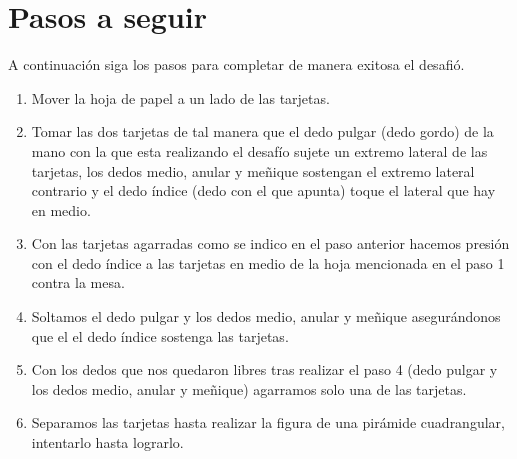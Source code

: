 \documentclass{article}
\begin{document}
\section{Pasos a seguir} \label{contenido}
A continuación siga los pasos para completar de manera exitosa el desafió. 

\begin{enumerate}
    \item Mover la hoja de papel a un lado de las tarjetas.
    \item Tomar las dos tarjetas de tal manera que el dedo pulgar (dedo gordo) de la mano con la que esta realizando el desafío sujete un extremo lateral de las tarjetas, los dedos medio, anular y meñique sostengan el extremo lateral contrario y el dedo índice (dedo con el que apunta) toque el lateral que hay en medio.
    \item Con las tarjetas agarradas como se indico en el paso anterior hacemos presión con el dedo índice a las tarjetas en medio de la hoja mencionada en el paso 1 contra la mesa. 
    \item Soltamos el dedo pulgar y los dedos medio, anular y meñique asegurándonos que el el dedo índice sostenga las tarjetas.
    \item Con los dedos que nos quedaron libres tras realizar el paso 4 (dedo pulgar y los dedos medio, anular y meñique) agarramos solo una de las tarjetas.
    \item Separamos las tarjetas hasta realizar la figura de una pirámide cuadrangular, intentarlo hasta lograrlo.
\end{enumerate}




\end{document}

